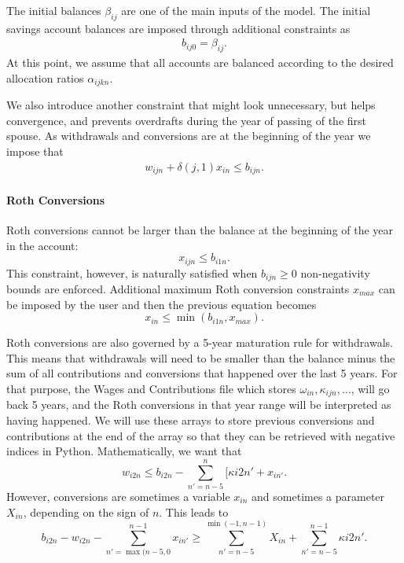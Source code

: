 \documentclass{report}[fleqn,12pt]
\begin{document}
	The initial balances $\beta_{ij}$ are one of the main inputs of the model.
	The initial savings account balances are imposed through additional constraints as
	\begin{eqnarray}
		\label{Eq:InitialBalance}
		b_{ij0} = \beta_{ij}.
	\end{eqnarray}
	At this point, we assume that all accounts are balanced according to the desired
	allocation ratios $\alpha_{ijkn}$.

	We also introduce another constraint that might look unnecessary, but helps
	convergence, and prevents overdrafts during the year of passing of the first spouse.
	As withdrawals and conversions are at the beginning of the year 
	we impose that
	\begin{eqnarray}
		w_{ijn} + \delta(j, 1)x_{in} \le b_{ijn}.
	\end{eqnarray}

\paragraph*{Roth Conversions}
	Roth conversions cannot be larger than the balance at the beginning of the year in the account:
	\begin{equation}
		x_{ijn} \le b_{i1n}.
	\end{equation}
	This constraint, however, is naturally satisfied when $b_{ijn} \ge 0$ non-negativity bounds are enforced.
	Additional maximum Roth conversion constraints $x_{max}$ can be imposed by the user and
	then the previous equation becomes
	\begin{equation}
		x_{in} \le \min(b_{i1n}, x_{max}).
	\end{equation}

	Roth conversions are also governed by a 5-year maturation rule for withdrawals. This means
	that withdrawals will need to be smaller than the balance minus the sum of all contributions
	and conversions that happened over the last 5 years. For that purpose, the Wages and Contributions
	file which stores $\omega_{in}, \kappa_{ijn}, \ldots$, will go back 5 years, and the Roth
	conversions in that year range will be interpreted as having happened. We will use
	these arrays to store previous conversions and contributions at the end of the array so that
	they can be retrieved with negative indices in Python. Mathematically, we want that
	\begin{equation}
		w_{i2n} \le b_{i2n} - \sum_{n'=n-5}^n [ \kappa{i2n'} + x_{in'}.
	\end{equation}
	However, conversions are sometimes a variable $x_{in}$
	and sometimes a parameter $X_{in}$, depending on the sign of $n$.
	This leads to
	\begin{equation}
		b_{i2n} - w_{i2n} - \sum_{n'=\max(n-5, 0}^{n-1} x_{in'}
		\ge \sum_{n'=n-5}^{\min(-1, n-1)} X_{in} + \sum_{n'=n-5}^{n-1} \kappa{i2n'}.
	\end{equation}
\end{document}
